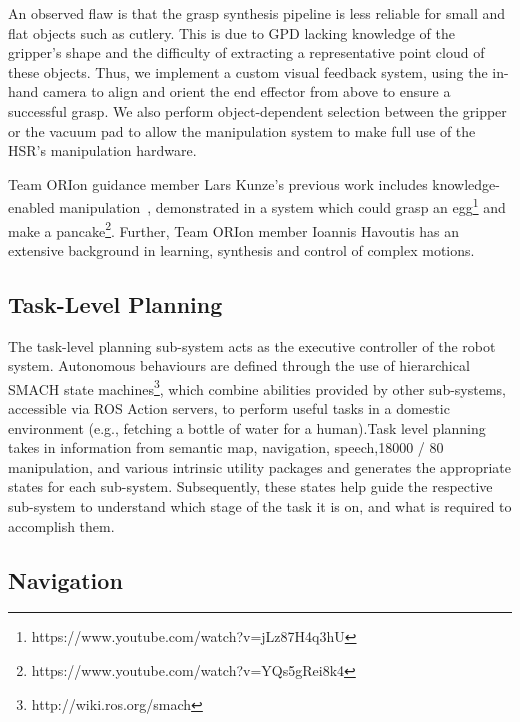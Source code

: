 \documentclass[runningheads,a4paper]{llncs}
\newcommand{\teamori}{Team ORIon}
\begin{document}
An observed flaw is that the grasp synthesis pipeline is less reliable for small and flat objects such as cutlery. This is due to GPD lacking knowledge of the gripper’s shape and the difficulty of extracting a representative point cloud of these objects. Thus, we implement a custom visual feedback system, using the in-hand camera to align and orient the end effector from above to ensure a successful grasp. We also perform object-dependent selection between the gripper or the vacuum pad to allow the manipulation system to make full use of the HSR's manipulation hardware.

%
\teamori{} guidance member Lars Kunze's previous work includes knowledge-enabled manipulation~\cite{kunze15aij}, demonstrated in a system which could grasp an egg\footnote{https://www.youtube.com/watch?v=jLz87H4q3hU} and make a pancake\footnote{https://www.youtube.com/watch?v=YQs5gRei8k4}. 
%
Further, \teamori{} member Ioannis Havoutis has an extensive background in learning, synthesis and control of complex motions.

\subsection{Task-Level Planning}\label{sec:capability-Task-Level Planning}

The task-level planning sub-system acts as the executive controller of the robot system. Autonomous behaviours are defined through the use of hierarchical SMACH state machines\footnote{http://wiki.ros.org/smach}, which combine abilities provided by other sub-systems, accessible via ROS Action servers, to perform useful tasks in a domestic environment (e.g., fetching a bottle of water for a human).Task level planning takes in information from semantic map, navigation, speech,18000 / 80 manipulation, and various intrinsic utility packages and generates the appropriate states for each sub-system. Subsequently, these states help guide the respective sub-system to understand which stage of the task it is on, and what is required to accomplish them. 

\subsection{Navigation}\label{sec:capability-navigation}
\end{document}
